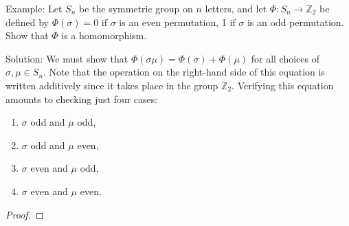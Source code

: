 \begin{theorem}[Exercise 19]\label{Ex19}
    Example: Let $S_n$ be the symmetric group on $n$ letters, and let $\Phi : S_n \to \mathbb{Z}_2$ be defined by $\Phi(\sigma) = 0$ if $\sigma$ is an even permutation, 1 if $\sigma$ is an odd permutation. Show that $\Phi$ is a homomorphism.

    Solution: We must show that $\Phi(\sigma\mu) = \Phi(\sigma) + \Phi(\mu)$ for all choices of $\sigma, \mu \in S_n$. Note that the operation on the right-hand side of this equation is written additively since it takes place in the group $\mathbb{Z}_2$. Verifying this equation amounts to checking just four cases:
    \begin{enumerate}
        \item $\sigma$ odd and $\mu$ odd,
        \item $\sigma$ odd and $\mu$ even,
        \item $\sigma$ even and $\mu$ odd,
        \item $\sigma$ even and $\mu$ even.
    \end{enumerate}
\end{theorem}
\begin{proof}

\end{proof}
